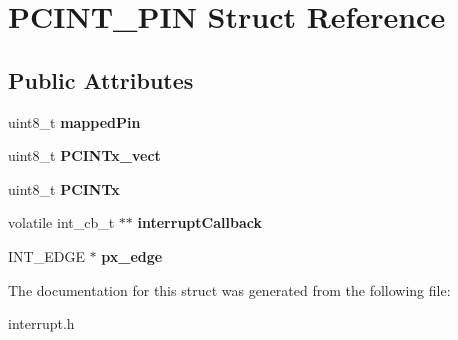 \hypertarget{structPCINT__PIN}{}\section{P\+C\+I\+N\+T\+\_\+\+P\+IN Struct Reference}
\label{structPCINT__PIN}
\subsection*{Public Attributes}
\begin{DoxyCompactItemize}
\item 
\mbox{\label{structPCINT__PIN_a2496d6cb8626cb2f59cbce2275c955f7}} 
uint8\+\_\+t {\bfseries mapped\+Pin}
\item 
\mbox{\label{structPCINT__PIN_afc86dc0ea0cd5858b9bd39354192ef0e}} 
uint8\+\_\+t {\bfseries P\+C\+I\+N\+Tx\+\_\+vect}
\item 
\mbox{\label{structPCINT__PIN_a365ae7574c175d0e95b17e72f6d10d14}} 
uint8\+\_\+t {\bfseries P\+C\+I\+N\+Tx}
\item 
\mbox{\label{structPCINT__PIN_a86cd558d3cb07e08e09aa5b4fc764a6b}} 
volatile int\+\_\+cb\+\_\+t $\ast$$\ast$ {\bfseries interrupt\+Callback}
\item 
\mbox{\label{structPCINT__PIN_ac80a352adca1ee695bd338be6e3828e3}} 
I\+N\+T\+\_\+\+E\+D\+GE $\ast$ {\bfseries px\+\_\+edge}
\end{DoxyCompactItemize}


The documentation for this struct was generated from the following file\+:\begin{DoxyCompactItemize}
\item 
interrupt.\+h\end{DoxyCompactItemize}
